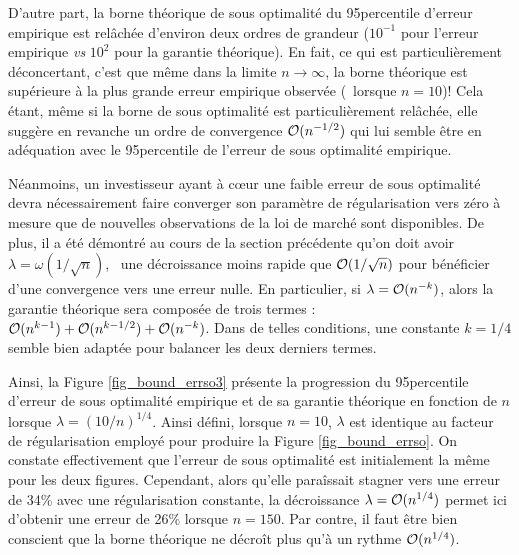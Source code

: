 D'autre part, la borne théorique de sous optimalité du 95\ieme percentile d'erreur
empirique est relâchée d'environ deux ordres de grandeur ($10^{-1}$ pour l'erreur
empirique \textit{vs} $10^{2}$ pour la garantie théorique). En fait, ce qui est
particulièrement déconcertant, c'est que même dans la limite $n\to\infty$, la borne théorique est
supérieure à la plus grande erreur empirique observée (\ie\ lorsque $n=10$)!  Cela étant,
même si la borne de sous optimalité est particulièrement relâchée, elle suggère en
revanche un ordre de convergence $\mathcal O(n^{-1/2})$ qui lui semble être en adéquation avec
le 95\ieme percentile de l'erreur de sous optimalité empirique.

Néanmoins, un investisseur ayant à cœur une faible erreur de sous optimalité devra
nécessairement faire converger son paramètre de régularisation vers zéro à mesure que de
nouvelles observations de la loi de marché sont disponibles. De plus, il a été démontré au
cours de la section précédente qu'on doit avoir $\lambda = \omega(1/\sqrt{n})$, \ie\ une décroissance
moins rapide que $\mathcal O(1/\sqrt{n})$ pour bénéficier d'une convergence vers une erreur
nulle. En particulier, si $\lambda = \mathcal O(n^{-k})$, alors la garantie théorique sera composée
de trois termes : $\mathcal O(n^{k-1}) + \mathcal O(n^{k-1/2}) + \mathcal O(n^{-k})$. Dans de telles
conditions, une constante $k=1/4$ semble bien adaptée pour balancer les deux derniers
termes.

Ainsi, la Figure \ref{fig_bound_errso3} présente la progression du 95\ieme percentile
d'erreur de sous optimalité empirique et de sa garantie théorique en fonction de $n$
lorsque $\lambda=(10/n)^{1/4}$. Ainsi défini, lorsque $n=10$, $\lambda$ est identique au facteur de
régularisation employé pour produire la Figure \ref{fig_bound_errso}. On constate
effectivement que l'erreur de sous optimalité est initialement la même pour les deux
figures. Cependant, alors qu'elle paraîssait stagner vers une erreur de 34\% avec une
régularisation constante, la décroissance $\lambda = \mathcal O(n^{1/4})$ permet ici d'obtenir une
erreur de 26\% lorsque $n=150$. Par contre, il faut être bien conscient que la borne
théorique ne décroît plus qu'à un rythme $\mathcal O(n^{1/4})$.

\newpage


